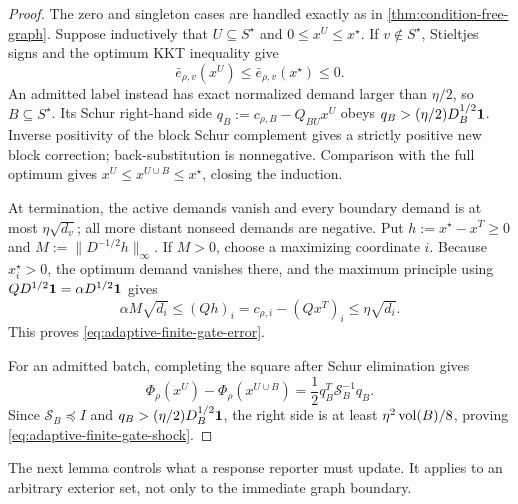 \begin{proof}
The zero and singleton cases are handled exactly as in
\cref{thm:condition-free-graph}.  Suppose inductively that
$U\subseteq S^\star$ and $0\leq x^U\leq x^\star$.  If
$v\notin S^\star$, Stieltjes signs and the optimum KKT inequality give
\begin{equation*}
 \bar e_{\rho,v}(x^U)
 \leq \bar e_{\rho,v}(x^\star)\leq0.
\end{equation*}
An admitted label instead has exact normalized demand larger than
$\eta/2$, so $B\subseteq S^\star$.  Its Schur right-hand side
$q_B:=c_{\rho,B}-Q_{BU}x^U$ obeys
$q_B>(\eta/2)D_B^{1/2}\mathbf{1}$.  Inverse positivity of the block Schur
complement gives a strictly positive new block correction; back-substitution
is nonnegative.  Comparison with the full optimum gives
$x^U\leq x^{U\cup B}\leq x^\star$, closing the induction.

At termination, the active demands vanish and every boundary demand is at
most $\eta\sqrt{d_v}$; all more distant nonseed demands are negative.  Put
$h:=x^\star-x^T\geq0$ and
$M:=\|D^{-1/2}h\|_\infty$.  If $M>0$, choose a maximizing coordinate $i$.
Because $x_i^\star>0$, the optimum demand vanishes there, and the maximum
principle using $QD^{1/2}\mathbf{1}=\alpha D^{1/2}\mathbf{1}$ gives
\begin{equation*}
 \alpha M\sqrt{d_i}
 \leq(Qh)_i
 =c_{\rho,i}-(Qx^T)_i
 \leq\eta\sqrt{d_i}.
\end{equation*}
This proves \cref{eq:adaptive-finite-gate-error}.

For an admitted batch, completing the square after Schur elimination gives
\begin{equation*}
 \Phi_\rho(x^U)-\Phi_\rho(x^{U\cup B})
 =\frac12q_B^T\mathcal S_B^{-1}q_B.
\end{equation*}
Since $\mathcal S_B\preceq I$ and
$q_B>(\eta/2)D_B^{1/2}\mathbf{1}$, the right side is at least
$\eta^2\operatorname{vol}(B)/8$, proving
\cref{eq:adaptive-finite-gate-shock}.
\end{proof}

The next lemma controls what a response reporter must update.  It applies to
an arbitrary exterior set, not only to the immediate graph boundary.

